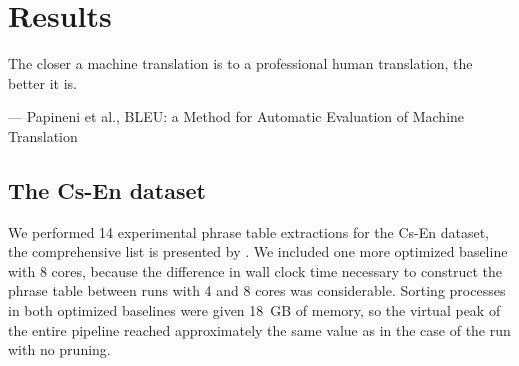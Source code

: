 \chapter{Results}
\label{chap:results}

\setlength{\epigraphwidth}{1.0\textwidth}
\epigraph{The closer a machine translation is to a professional human translation, the better it is.}{--- Papineni et al., BLEU: a Method for Automatic Evaluation of Machine Translation}


\section{The Cs-En dataset}
\label{sec:cs-en-results}

We performed 14 experimental phrase table extractions for the Cs-En dataset,
the comprehensive list is presented by .
We included one more optimized baseline with 8 cores, because the difference in
wall clock time necessary to construct the phrase table between runs with 4 and 8 cores
was considerable.
Sorting processes in both optimized baselines were given 18~GB of memory, so the virtual
peak of the entire pipeline reached approximately the same value as in the case of the \eppex{}
run with no pruning.

